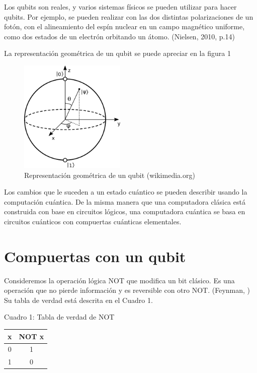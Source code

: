 \documentclass[11pt,a4paper]{article}
\begin{document}
Los qubits son reales, y varios sistemas físicos se pueden utilizar para hacer qubits. Por ejemplo, se pueden realizar con las dos distintas polarizaciones de un fotón, con el alineamiento del espín nuclear en un campo magnético uniforme, como dos estados de un electrón orbitando un átomo. (Nielsen, 2010, p.14) 

La representación geométrica de un qubit se puede apreciar en la figura 1

\begin{figure}
\centering
\includegraphics[width=0.45\textwidth]{qubit}
\caption{Representación geométrica de un qubit (wikimedia.org)}
\end{figure}

Los cambios que le suceden a un estado cuántico se pueden describir usando la computación cuántica. De la misma manera que una computadora clásica está construida con base en circuitos lógicos, una computadora cuántica se basa en circuitos cuánticos con compuertas cuánticas elementales.
 
\section*{Compuertas con un qubit}
Consideremos la operación lógica NOT que modifica un bit clásico. Es una operación que no pierde información y es reversible con otro NOT. (Feynman, )
Su tabla de verdad está descrita en el Cuadro 1.

Cuadro 1: Tabla de verdad de NOT
\begin{center}
    \begin{tabular}{ c | c }
    x & NOT x \\ 
	\hline
    0 & 1\\ 
    1 & 0 \\ 
    \end{tabular}
\end{center}
\end{document}
